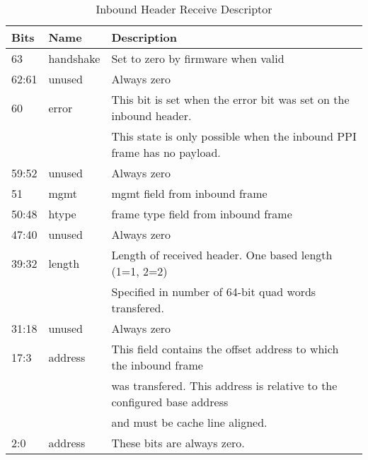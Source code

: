 \documentclass[11pt]{article}
\begin{document}
\begin{table}[H]
\small
\centering
   \begin{tabular}{| l | l | l | } 
      \hline \textbf{Bits} & \textbf{Name} & \textbf{Description} \\
      \hline 63            & handshake     & Set to zero by firmware when valid     \\
      \hline 62:61         & unused        & Always zero                                                            \\ 
      \hline 60            & error         & This bit is set when the error bit was set on the inbound header.      \\
                           &               & This state is only possible when the inbound PPI frame has no payload. \\
      \hline 59:52         & unused        & Always zero                                                       \\
      \hline 51            & mgmt          & mgmt field from inbound frame                                          \\ 
      \hline 50:48         & htype         & frame type field from inbound frame                                    \\
      \hline 47:40         & unused        & Always zero                                                       \\
      \hline 39:32         & length        & Length of received header. One based length (1=1, 2=2)                 \\
                           &               & Specified in number of 64-bit quad words transfered.                   \\
      \hline 31:18         & unused        & Always zero                                                       \\
      \hline 17:3          & address       & This field contains the offset address to which the inbound frame \\
                           &               & was transfered. This address is relative to the configured base address \\
                           &               & and must be cache line aligned.                                         \\
      \hline 2:0           & address       & These bits are always zero.                                                \\
      \hline
   \end{tabular}
   \caption{Inbound Header Receive Descriptor}
   \label{tab:ib_rx_desc}
\end{table}
\end{document}
